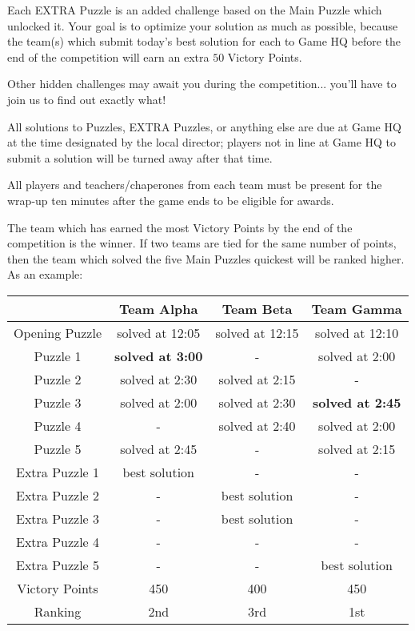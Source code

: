 \begin{rules}
Each EXTRA Puzzle is an added challenge based on the Main Puzzle which unlocked
it. Your goal is to optimize your solution as much as possible, because
the team(s) which submit today's best solution for each
to Game HQ before the end of the
competition will earn an extra \(50\) Victory Points.


\vfill



Other hidden challenges may await you during the competition... you'll
have to join us to find out exactly what!


\vfill


All solutions to Puzzles, EXTRA Puzzles, or anything else
are due at Game HQ at the time designated by the local director;
players not in line at Game HQ to submit a
solution will be turned away after that time.

All players and teachers/chaperones
from each team must be present for the wrap-up ten minutes
after the game ends to be eligible for awards.

\vfill


The team which has earned the most Victory Points by the end of the competition
is the winner. If two teams are tied for the same number of points,
then the team which solved the five Main Puzzles
quickest will be ranked higher. As an example:

\begin{center}
\begin{tabular}{c|c|c|c}
      & Team Alpha & Team Beta & Team Gamma \\\hline\hline
Opening Puzzle & solved at 12:05 & solved at 12:15 & solved at 12:10 \\\hline
Puzzle 1 & \textbf{solved at 3:00} & - & solved at 2:00 \\
Puzzle 2 & solved at 2:30 & solved at 2:15 & -  \\
Puzzle 3 & solved at 2:00 & solved at 2:30 & \textbf{solved at 2:45} \\
Puzzle 4 & - & solved at 2:40 & solved at 2:00 \\
Puzzle 5 & solved at 2:45 & - & solved at 2:15 \\\hline
Extra Puzzle 1 & best solution & - & - \\
Extra Puzzle 2 & - & best solution & - \\
Extra Puzzle 3 & - & best solution  & - \\
Extra Puzzle 4 & - & - & - \\
Extra Puzzle 5 & - & - & best solution \\\hline
Victory Points & 450 & 400 & 450 \\
Ranking & 2nd & 3rd & 1st
\end{tabular}
\end{center}


\end{rules}
